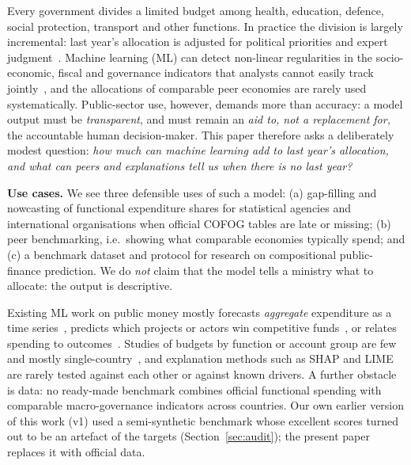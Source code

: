Every government divides a limited budget among health, education, defence, social protection, transport and other functions. In practice the division is largely incremental: last year's allocation is adjusted for political priorities and expert judgment~\cite{davis1966,jones2005}. Machine learning (ML) can detect non-linear regularities in the socio-economic, fiscal and governance indicators that analysts cannot easily track jointly~\cite{athey2019,mullainathan2017}, and the allocations of comparable peer economies are rarely used systematically. Public-sector use, however, demands more than accuracy: a model output must be \emph{transparent}, and must remain an \emph{aid to, not a replacement for,} the accountable human decision-maker. This paper therefore asks a deliberately modest question: \emph{how much can machine learning add to last year's allocation, and what can peers and explanations tell us when there is no last year?}

\medskip\noindent\textbf{Use cases.} We see three defensible uses of such a model: (a) gap-filling and nowcasting of functional expenditure shares for statistical agencies and international organisations when official COFOG tables are late or missing; (b) peer benchmarking, i.e.\ showing what comparable economies typically spend; and (c) a benchmark dataset and protocol for research on compositional public-finance prediction. We do \emph{not} claim that the model tells a ministry what to allocate: the output is descriptive.

Existing ML work on public money mostly forecasts \emph{aggregate} expenditure as a time series~\cite{gur2025,dragulin2025}, predicts which projects or actors win competitive funds~\cite{caravaggio2025,distefano2025}, or relates spending to outcomes~\cite{valle2022,guerrero2022}. Studies of budgets by function or account group are few and mostly single-country~\cite{santschi2024,radulescu2015,nonato2026,mohith2026}, and explanation methods such as SHAP and LIME are rarely tested against each other or against known drivers. A further obstacle is data: no ready-made benchmark combines official functional spending with comparable macro-governance indicators across countries. Our own earlier version of this work (v1) used a semi-synthetic benchmark whose excellent scores turned out to be an artefact of the targets (Section~\ref{sec:audit}); the present paper replaces it with official data.

